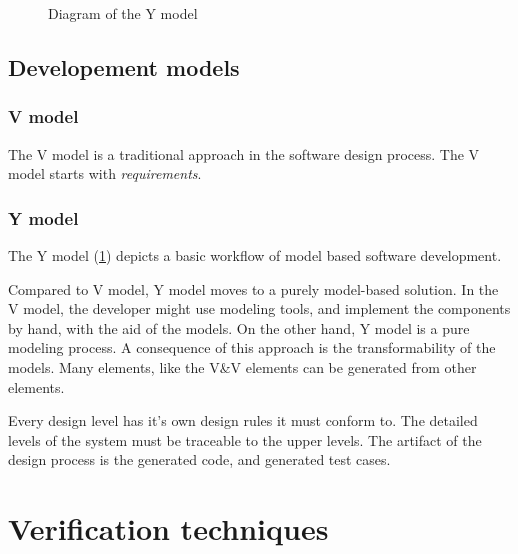 \begin{figure}
	\caption{Diagram of the Y model \citep{MDSD_INTRO}}
\label{fig:y_model}%
\end{figure}

\subsection{Developement models}

\subsubsection{V model}

The V model is a traditional approach in the software design process. The V model starts with \emph{requirements}.

\subsubsection{Y model}

The Y model (\cref{fig:y_model}) depicts a basic workflow of model based software development.

Compared to V model, Y model moves to a purely model-based solution. In the V model, the developer might use modeling tools, and implement the components by hand, with the aid of the models. On the other hand, Y model is a pure modeling process. A consequence of this approach is the transformability of the models. Many elements, like the V\&V elements can be generated from other elements.

Every design level has it's own design rules it must conform to. The detailed levels of the system must be traceable to the upper levels. The artifact of the design process is the generated code, and generated test cases.

\section{Verification techniques}
\label{sec:verification_techniques}


